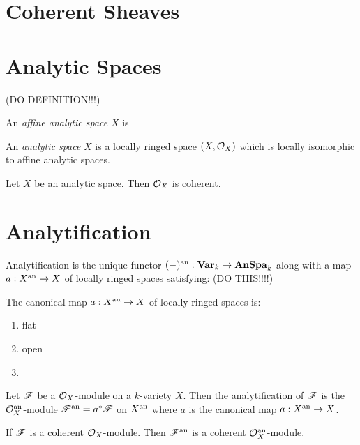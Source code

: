 \documentclass[12pt]{article}
\begin{document}
\section{Coherent Sheaves}

\section{Analytic Spaces}

(DO DEFINITION!!!)

\begin{defn}
An \textit{affine analytic space} $X$ is 
\end{defn}

\begin{defn}
An \textit{analytic space} $X$ is a locally ringed space $(X, \mathcal{O}_{X})$ which is locally isomorphic to affine analytic spaces.
\end{defn}

\begin{theorem}
Let $X$ be an analytic space. Then $\mathcal{O}_{X}$ is coherent. 
\end{theorem}

\section{Analytification}

\begin{defn}
Analytification is the unique functor $(-)^{\mathrm{an}} : \mathbf{Var}_k \to \mathbf{AnSpa}_k$ along with a map $a : X^{\mathrm{an}} \to X$ of locally ringed spaces satisfying:
(DO THIS!!!!)
\end{defn}

\begin{lemma}
The canonical map $a : X^{\mathrm{an}} \to X$ of locally ringed spaces is:
\begin{enumerate}
\item flat
\item open
\item 
\end{enumerate}
\end{lemma}

\begin{defn}
Let $\mathscr{F}$ be a $\mathcal{O}_{X}$-module on a $k$-variety $X$. Then the analytification of $\mathscr{F}$ is the $\mathcal{O}_{X}^{\mathrm{an}}$-module $\mathscr{F}^{\mathrm{an}} = a^* \mathscr{F}$ on $X^{\mathrm{an}}$ where $a$ is the canonical map $a : X^{\mathrm{an}} \to X$. 
\end{defn}

\begin{prop}
If $\mathscr{F}$ is a coherent $\mathcal{O}_{X}$-module. Then $\mathscr{F}^{\mathrm{an}}$ is a coherent $\mathcal{O}_{X}^{\mathrm{an}}$-module.
\end{prop}
\end{document}
